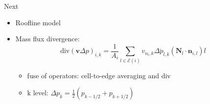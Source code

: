 \documentclass{beamer}
\begin{document}
\begin{frame}{Next}
  \begin{itemize}
    \item Roofline model
    \item Mass flux divergence:
      \begin{equation*}
        \text{div}(\bm{v}\Delta p)_{i, k}=\frac{1}{A_i} \sum\limits_{l\in\mathcal{E}(i)}v_{n_l,k}\Delta\breve{p}_{l,k}(\bm{N}_l\cdot\bm{n}_{i,l})l
      \end{equation*}
      \begin{itemize}
        \item fuse of operators: cell-to-edge averaging and div
        \item k level: $\Delta p_k = \frac{1}{2}(p_{k-1/2}+p_{k+1/2})$
      \end{itemize}
  \end{itemize}
\end{frame}
\end{document}
